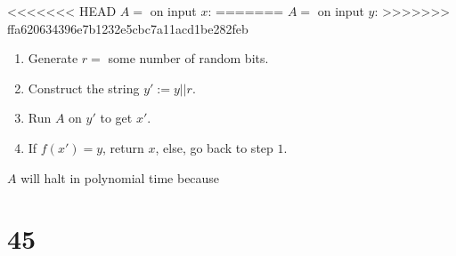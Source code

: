 \documentclass[letterpaper,notitlepage,twoside]{article}
\begin{document}
<<<<<<< HEAD
$A =$ on input $x$:
=======
$A =$ on input $y$:
>>>>>>> ffa620634396e7b1232e5cbc7a11acd1be282feb
\begin{enumerate}
\item Generate $r = $ some number of random bits.
\item Construct the string $y' := y || r$.
\item Run $A$ on $y'$ to get $x'$.
\item If $f(x') = y$, return $x$, else, go back to step $1$.
\end{enumerate}

$A$ will halt in polynomial time because \\

\section*{45}
\end{document}
